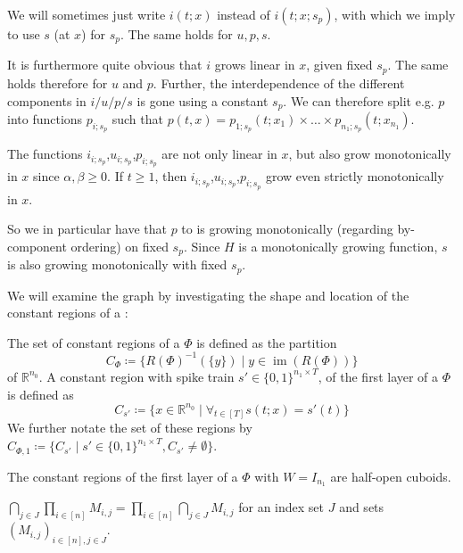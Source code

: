 \begin{remark}\label{rem:regions-non-recursive-defs}
  We will sometimes just write \(i(t;x)\) instead of \(i(t;x;s_p)\), with which we imply to use \(s\) (at \(x\)) for \(s_p\). The same holds for \(u,p,s\).

  It is furthermore quite obvious that \(i\) grows linear in \(x\), given fixed \(s_p\). The same holds therefore for \(u\) and \(p\). Further, the interdependence of the different components in \(i/u/p/s\) is gone using a constant \(s_p\). We can therefore split e.g. \(p\) into functions \(p_{i;s_p}\) such that \(p(t,x)=p_{1;s_p}(t;x_1)×…×p_{n_1;s_p}(t;x_{n_1})\).

  The functions \(i_{i;s_p}\),\(u_{i;s_p}\),\(p_{i;s_p}\) are not only linear in \(x\), but also grow monotonically in \(x\) since \(α,β≥0\). If \(t≥1\), then \(i_{i;s_p}\),\(u_{i;s_p}\),\(p_{i;s_p}\) grow even strictly monotonically in \(x\).

  So we in particular have that \(p\) to is growing monotonically (regarding by-component ordering) on fixed \(s_p\).
  Since \(H\) is a monotonically growing function, \(s\) is also growing monotonically with fixed \(s_p\).
\end{remark}
We will examine the graph by investigating the shape and location of the constant regions of a \rdtlifsnn:

\begin{definition}
  The set of constant regions of a \rdtlifsnn \(Φ\) is defined as the partition
  \[ C_Φ≔\{R(Φ)^{-1}(\{y\})\mid y∈\operatorname{im}(R(Φ))\} \]
  of \(ℝ^{n_0}\). A constant region with spike train \(s'∈\{0,1\}^{n_1×T}\), of the first layer of a \rdtlifsnn \(Φ\) is defined as
  \[ C_{s'}≔\{x∈ℝ^{n_0}\mid∀_{t∈[T]}s(t;x)=s'(t)\} \]
  We further notate the set of these regions by \( C_{Φ,1}≔\{C_{s'}\mid s'∈\{0,1\}^{n_1×T},C_{s'}≠∅\} \).
\end{definition}


\begin{proposition}\label{prop:const-regions-cuboids}
  The constant regions of the first layer of a \rdtlifsnn \(Φ\) with \(W=I_{n_1}\) are half-open cuboids.
\end{proposition}

\begin{lemma}\label{lem:intersection-and-product}
  \(\bigcap_{j∈J}\prod_{i∈[n]}M_{i,j}=\prod_{i∈[n]}\bigcap_{j∈J}M_{i,j}\) for an index set \(J\) and sets \((M_{i,j})_{i∈[n],j∈J}\).
\end{lemma}

